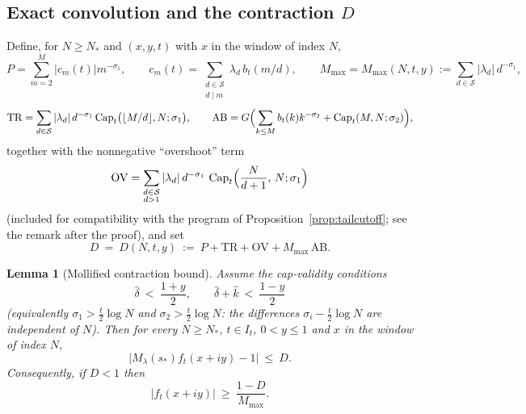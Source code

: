 \documentclass[11pt]{article}
\newtheorem{lemma}[theorem]{Lemma}
\theoremstyle{definition}
\newcommand{\calS}{\mathcal{S}}
\newcommand{\CapT}{\operatorname{Cap}}
\begin{document}
\subsection{Exact convolution and the contraction
\texorpdfstring{$D$}{D}}

Define, for $N\ge N_*$ and $(x,y,t)$ with $x$ in the window of index
$N$,
\[
P=\sum_{m=2}^{M}|c_m(t)|m^{-\sigma_1},
\qquad
c_m(t)=\sum_{\substack{d\in\calS\\ d\mid m}}\lambda_d\,b_t(m/d),
\qquad
M_{\max}=M_{\max}(N,t,y):=\sum_{d\in\calS}|\lambda_d|\,d^{-\sigma_1},
\]
\[
\mathrm{TR}=\sum_{d\in\calS}|\lambda_d|\,d^{-\sigma_1}
\CapT_t\bigl(\lfloor M/d\rfloor,N;\sigma_1\bigr),
\qquad
\mathrm{AB}=G\Bigl(\sum_{k\le M}b_t(k)k^{-\sigma_2}
+\CapT_t(M,N;\sigma_2)\Bigr),
\]
together with the nonnegative ``overshoot'' term
\[
\mathrm{OV}=\sum_{\substack{d\in\calS\\ d>1}}
|\lambda_d|\,d^{-\sigma_1}\,
\CapT_t\Bigl(\frac{N}{d+1},\,N;\sigma_1\Bigr)
\]
(included for compatibility with the program of
Proposition~\ref{prop:tailcutoff}; see the remark after the proof),
and set
\begin{equation}\label{eq:D}
D\ =\ D(N,t,y)\ :=\ P+\mathrm{TR}+\mathrm{OV}+M_{\max}\,\mathrm{AB}.
\end{equation}

\begin{lemma}[Mollified contraction bound]\label{lem:contraction}
Assume the cap-validity conditions
\begin{equation}\label{eq:capvalid}
\widehat\delta\ <\ \frac{1+y}2,
\qquad
\widehat\delta+\widehat k\ <\ \frac{1-y}2
\end{equation}
(equivalently $\sigma_1>\frac t2\log N$ and
$\sigma_2>\frac t2\log N$: the differences
$\sigma_i-\frac t2\log N$ are independent of $N$). Then for every
$N\ge N_*$, $t\in I_t$, $0<y\le1$ and $x$ in the window of index
$N$,
\[
\bigl|M_\lambda(s_*)f_t(x+iy)-1\bigr|\ \le\ D .
\]
Consequently, if $D<1$ then
\begin{equation}\label{eq:flowlower}
|f_t(x+iy)|\ \ge\ \frac{1-D}{M_{\max}} .
\end{equation}
\end{lemma}
\end{document}
